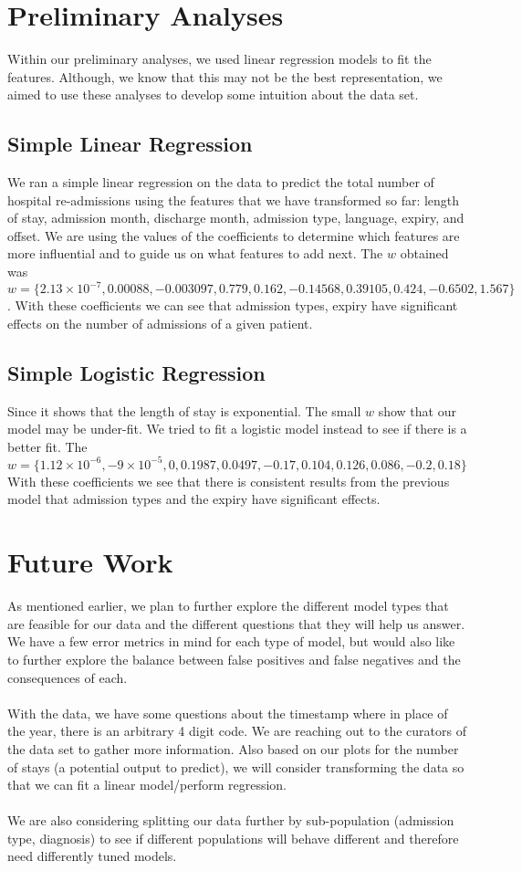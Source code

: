 \documentclass[12pt]{article}
\begin{document}
\section{Preliminary Analyses}
Within our preliminary analyses, we used linear regression models to fit the features. Although, we know that this may not be the best representation, we aimed to use these analyses to develop some intuition about the data set. 

\subsection{Simple Linear Regression}
We ran a simple linear regression on the data to predict the total number of hospital re-admissions using the features that we have transformed so far: length of stay, admission month, discharge month, admission type, language, expiry, and offset. We are using the values of the coefficients to determine which features are more influential and to guide us on what features to add next. The $w$ obtained was $w = \{2.13 \times 10^{-7}, 0.00088, -0.003097, 0.779, 0.162, -0.14568, 0.39105, 0.424, -0.6502, 1.567\}$. With these coefficients we can see that admission types, expiry have significant effects on the number of admissions of a given patient. 

\subsection{Simple Logistic Regression}
Since it shows that the length of stay is exponential. The small $w$ show that our model may be under-fit. We tried to fit a logistic model instead to see if there is a better fit. The $w = \{1.12 \times 10^{-6}, -9 \times 10^{-5}, 0, 0.1987, 0.0497, -0.17, 0.104, 0.126, 0.086, -0.2, 0.18\}$ With these coefficients we see that there is consistent results from the previous model that admission types and the expiry have significant effects. 

\section{Future Work}
 As mentioned earlier, we plan to further explore the different model types that are feasible for our data and the different questions that they will help us answer. We have a few error metrics in mind for each type of model, but would also like to further explore the balance between false positives and false negatives and the consequences of each.
 \\ \\
 With the data, we have some questions about the timestamp where in place of the year, there is an arbitrary 4 digit code. We are reaching out to the curators of the data set to gather more information. Also based on our plots for the number of stays (a potential output to predict), we will consider transforming the data so that we can fit a linear model/perform regression.
 \\ \\
 We are also considering splitting our data further by sub-population (admission type, diagnosis) to see if different populations will behave different and therefore need differently tuned models.
\end{document}
